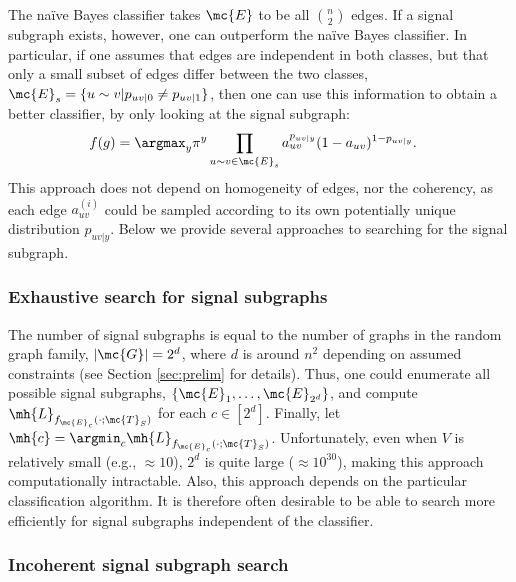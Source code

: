 The na\"{i}ve Bayes classifier takes $\mc{E}$ to be all $\binom{n}{2}$ edges.  If a signal subgraph exists, however, one can outperform the na\"{i}ve Bayes classifier.  In particular, if one assumes that edges are independent in both classes, but that only a small subset of edges differ between the two classes, $\mc{E}_{s}=\{u \sim v | \pp_{uv|0} \neq \pp_{uv|1}\}$, then one can use this information to obtain a better classifier, by only looking at the signal subgraph:
\begin{align} \label{eq:subgraph}
	f(g) &= \argmax_y \pi^y \prod_{u \sim v \in \mc{E}_{s}} a_{uv}^{\pp_{uv|y}} (1-a_{uv})^{1-\pp_{uv|y}}.
\end{align}
This approach does not depend on homogeneity of edges, nor the coherency, as each edge $a_{uv}^{(i)}$ could be sampled according to its own potentially unique distribution $p_{uv|y}$.  Below we provide several approaches to searching for the signal subgraph.


\subsubsection{Exhaustive search for signal subgraphs} %
\label{ssub:classifier_based_signal_subgraph_searches}

The number of signal subgraphs is equal to the number of graphs in the random graph family, $|\mc{G}|=2^d$, where $d$ is around $n^2$ depending on assumed constraints (see Section \ref{sec:prelim} for details).  Thus, one could enumerate all possible signal subgraphs, $\{\mc{E}_1,\ldots, \mc{E}_{2^d}\}$,
and compute $\mh{L}_{f_{\mc{E}_c}(\cdot; \mc{T}_S)}$ for each $c \in [2^d]$.  Finally, let $\mh{c}=\argmin_c \mh{L}_{f_{\mc{E}_c}(\cdot; \mc{T}_S)}$.  Unfortunately, even when $V$ is relatively small (e.g., $\approx 10$), $2^d$ is quite large ($\approx 10^{30}$), making this approach computationally intractable.  Also, this approach depends on the particular classification algorithm.  It is therefore often desirable to be able to search more efficiently for signal subgraphs independent of the classifier.



\subsubsection{Incoherent signal subgraph search} %
\label{ssub:classifier_free_signal_subgraph_searches}

